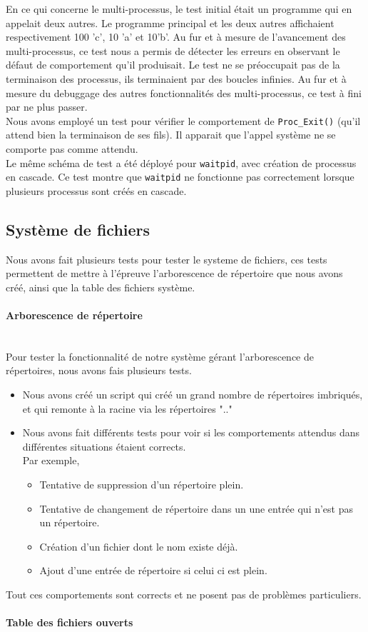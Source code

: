 \documentclass{report}
\newcommand{\myparagraph}[1]{\paragraph*{#1}\mbox{}\\}
\begin{document}
En ce qui concerne le multi-processus, le test initial était un programme qui en appelait deux autres. Le programme principal et les deux autres affichaient respectivement 100 'c', 10 'a' et 10'b'. Au fur et à mesure de l'avancement des multi-processus, ce test nous a permis de détecter les erreurs en observant le défaut de comportement qu'il produisait. Le test ne se préoccupait pas de la terminaison des processus, ils terminaient par des boucles infinies. Au fur et à mesure du debuggage des autres fonctionnalités des multi-processus, ce test à fini par ne plus passer.\\
Nous avons employé un test pour vérifier le comportement de \texttt{Proc\_Exit()} (qu'il attend bien la terminaison de ses fils). Il apparait que l'appel système ne se comporte pas comme attendu.\\
Le même schéma de test a été déployé pour \texttt{waitpid}, avec création de processus en cascade. Ce test montre que \texttt{waitpid} ne fonctionne pas correctement lorsque plusieurs processus sont créés en cascade.

\subsection*{Système de fichiers}
Nous avons fait plusieurs tests pour tester le systeme de fichiers, ces tests permettent de mettre à l’épreuve l'arborescence de répertoire que nous avons créé, ainsi que la table des fichiers système.\\
\myparagraph{Arborescence de répertoire}

Pour tester la fonctionnalité de notre système gérant l'arborescence de répertoires, nous avons fais plusieurs tests.
\begin{itemize}
	\item Nous avons créé un script qui créé un grand nombre de répertoires imbriqués, et qui remonte à la racine via les répertoires ".."
	\item Nous avons fait différents tests pour voir si les comportements attendus dans différentes situations étaient corrects.\\
	Par exemple,
	\begin{itemize}
		\item Tentative de suppression d'un répertoire plein.
		\item Tentative de changement de répertoire dans un une entrée qui n'est pas un répertoire.
		\item Création d'un fichier dont le nom existe déjà.
		\item Ajout d'une entrée de répertoire si celui ci est plein.
	\end{itemize}
\end{itemize}
Tout ces comportements sont corrects et ne posent pas de problèmes particuliers.
\myparagraph{Table des fichiers ouverts}
\end{document}
